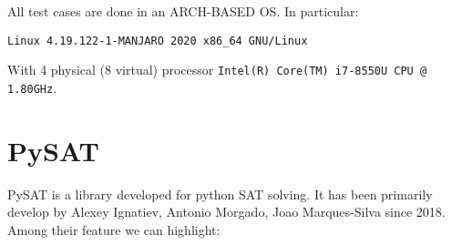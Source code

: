 All test cases are done in an ARCH-BASED OS. In particular:

  {\begin{center}
      \texttt{Linux 4.19.122-1-MANJARO  2020 x86\_64\ GNU/Linux}\\
    \end{center} }

  With 4 physical (8 virtual) processor \texttt{Intel(R) Core(TM) i7-8550U CPU @ 1.80GHz}. 

  
\section{PySAT}
PySAT\cite{imms-sat18} is a library developed for python SAT solving. It has been primarily develop by Alexey Ignatiev, Antonio Morgado, Joao Marques-Silva since 2018. Among their feature we can highlight:

